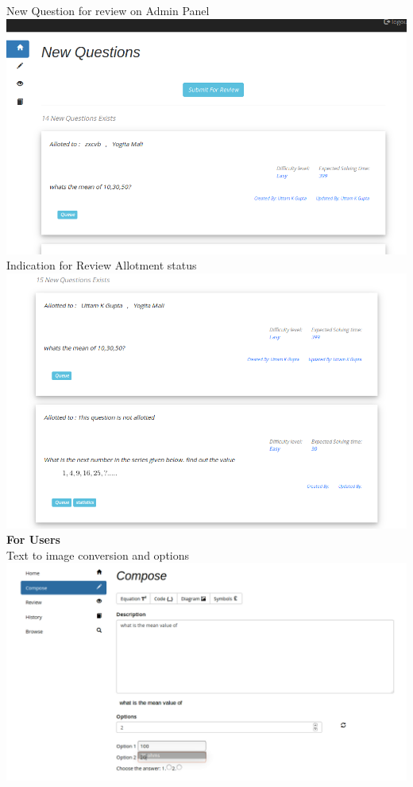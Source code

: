 \documentclass[a4paper,12pt,oneside]{book}
\begin{document}
\vspace{0.7in}
New Question for review on Admin Panel \\
\includegraphics[scale=0.35]{newquestions.png}	\\

\vspace{2in}
Indication for Review Allotment status \\
\includegraphics[scale=0.45]{allotedreview.png}	\\

\newpage
\textbf{For Users} \\
Text to image conversion and options\\
\includegraphics[scale=0.3]{compose.png}	\\
\end{document}
